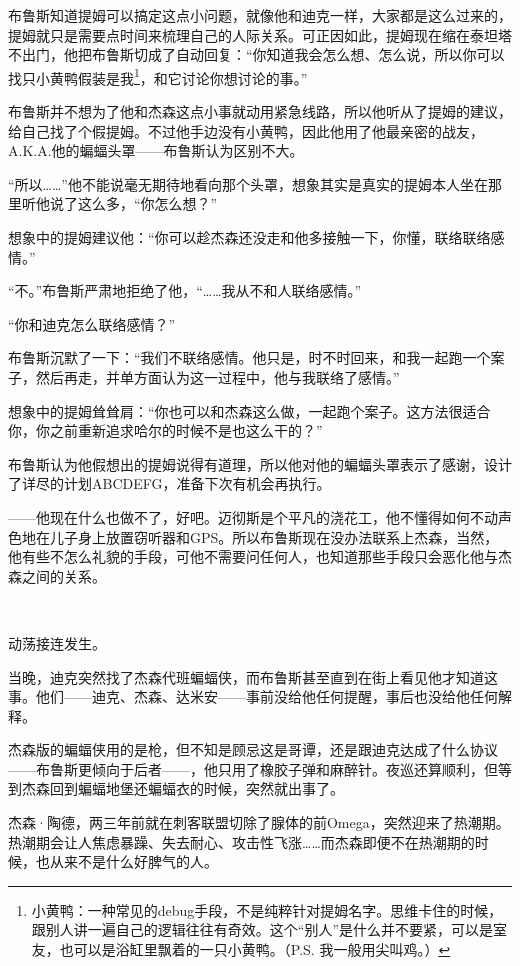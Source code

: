 \documentclass[../main]{subfiles}
\begin{document}
布鲁斯知道提姆可以搞定这点小问题，就像他和迪克一样，大家都是这么过来的，提姆就只是需要点时间来梳理自己的人际关系。可正因如此，提姆现在缩在泰坦塔不出门，他把布鲁斯切成了自动回复：“你知道我会怎么想、怎么说，所以你可以找只小黄鸭假装是我\footnote[1]{小黄鸭：一种常见的debug手段，不是纯粹针对提姆名字。思维卡住的时候，跟别人讲一遍自己的逻辑往往有奇效。这个“别人”是什么并不要紧，可以是室友，也可以是浴缸里飘着的一只小黄鸭。（P.S. 我一般用尖叫鸡。）}，和它讨论你想讨论的事。”

布鲁斯并不想为了他和杰森这点小事就动用紧急线路，所以他听从了提姆的建议，给自己找了个假提姆。不过他手边没有小黄鸭，因此他用了他最亲密的战友，A.K.A.他的蝙蝠头罩——布鲁斯认为区别不大。

“所以……”他不能说毫无期待地看向那个头罩，想象其实是真实的提姆本人坐在那里听他说了这么多，“你怎么想？”

想象中的提姆建议他：“你可以趁杰森还没走和他多接触一下，你懂，联络联络感情。”

“不。”布鲁斯严肃地拒绝了他，“……我从不和人联络感情。”

“你和迪克怎么联络感情？”

布鲁斯沉默了一下：“我们不联络感情。他只是，时不时回来，和我一起跑一个案子，然后再走，并单方面认为这一过程中，他与我联络了感情。”

想象中的提姆耸耸肩：“你也可以和杰森这么做，一起跑个案子。这方法很适合你，你之前重新追求哈尔的时候不是也这么干的？”

布鲁斯认为他假想出的提姆说得有道理，所以他对他的蝙蝠头罩表示了感谢，设计了详尽的计划ABCDEFG，准备下次有机会再执行。

——他现在什么也做不了，好吧。迈彻斯是个平凡的浇花工，他不懂得如何不动声色地在儿子身上放置窃听器和GPS。所以布鲁斯现在没办法联系上杰森，当然，他有些不怎么礼貌的手段，可他不需要问任何人，也知道那些手段只会恶化他与杰森之间的关系。

~\

动荡接连发生。

当晚，迪克突然找了杰森代班蝙蝠侠，而布鲁斯甚至直到在街上看见他才知道这事。他们——迪克、杰森、达米安——事前没给他任何提醒，事后也没给他任何解释。

杰森版的蝙蝠侠用的是枪，但不知是顾忌这是哥谭，还是跟迪克达成了什么协议——布鲁斯更倾向于后者——，他只用了橡胶子弹和麻醉针。夜巡还算顺利，但等到杰森回到蝙蝠地堡还蝙蝠衣的时候，突然就出事了。

杰森·陶德，两三年前就在刺客联盟切除了腺体的前Omega，突然迎来了热潮期。热潮期会让人焦虑暴躁、失去耐心、攻击性飞涨……而杰森即便不在热潮期的时候，也从来不是什么好脾气的人。
\end{document}
